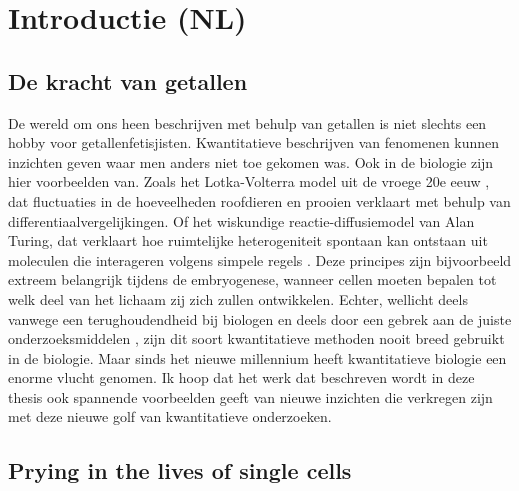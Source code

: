 

\chapter*{Introductie (NL)}




\section*{De kracht van getallen}

De wereld om ons heen beschrijven met behulp van getallen is niet slechts een hobby voor getallenfetisjisten.
Kwantitatieve beschrijven van fenomenen kunnen inzichten geven waar men anders niet toe gekomen was.
%
Ook in de biologie zijn hier voorbeelden van.
%
Zoals het Lotka-Volterra model uit de vroege 20e eeuw \cite{Lotka1920,Volterra1928}, dat fluctuaties in de hoeveelheden roofdieren en prooien verklaart met behulp van differentiaalvergelijkingen.
%
Of het wiskundige reactie-diffusiemodel van Alan Turing,
dat verklaart hoe ruimtelijke heterogeniteit spontaan kan ontstaan uit moleculen die 
interageren volgens simpele regels \cite{Turing1952}.
%
Deze principes zijn bijvoorbeeld extreem belangrijk tijdens de embryogenese, wanneer cellen moeten bepalen tot welk deel van het lichaam zij zich zullen ontwikkelen.
%
Echter,
wellicht deels vanwege een terughoudendheid bij biologen  \cite{Lazebnik2003} en deels door een gebrek aan de juiste onderzoeksmiddelen \cite{Kitano2002, Wollman2018}, 
zijn dit soort kwantitatieve methoden nooit breed gebruikt in de biologie.
%
Maar sinds het nieuwe millennium heeft kwantitatieve biologie
een enorme vlucht genomen.
%
Ik hoop dat het werk dat beschreven wordt in deze thesis ook spannende voorbeelden geeft van nieuwe inzichten die verkregen zijn met deze nieuwe golf van kwantitatieve onderzoeken.




\section{Prying in the lives of single cells}

